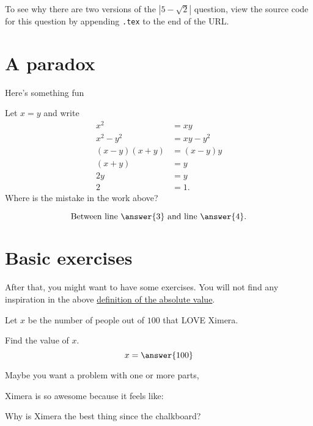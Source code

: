 \documentclass{ximera}
\begin{document}
To see why there are two versions of the $|5-\sqrt{2}|$ question, view the source code for this question by appending \verb|.tex| to the end of the URL.

\section{A paradox}


Here's something fun

\begin{paradox}[$0=1$] Let $x=y$ and write
\begin{align}
        x^2    & = xy       \\
    x^2 - y^2  & = xy - y^2 \\
    (x-y)(x+y) & = (x-y)y   \\
       (x+y)   & = y        \\
         2y    & = y        \\
          2    & =1.
\end{align}
Where is the mistake in the work above?
\begin{prompt} %
\[
\text{Between line }\answer{3} \text{ and line }\answer{4}.
\]
\end{prompt}
\end{paradox}


\section{Basic exercises}

After that, you might want to have some exercises.
You will not find any inspiration in the above \hyperref[def:absolute_value]{definition of the absolute value}.

\begin{exercise}
    Let $x$ be the number of people
    out of $100$ that LOVE Ximera.

    Find the value of $x$.
    \[
        x = \answer{100}
    \]
\end{exercise}

Maybe you want a problem with one or more parts,

\begin{exercise}
    Ximera is so awesome because it feels like:
    \begin{multipleChoice}
    \end{multipleChoice}
    \begin{exercise}
        Why is Ximera the best thing since the chalkboard?
        \begin{selectAll}
        \end{selectAll}
    \end{exercise}
\end{exercise}
\end{document}
